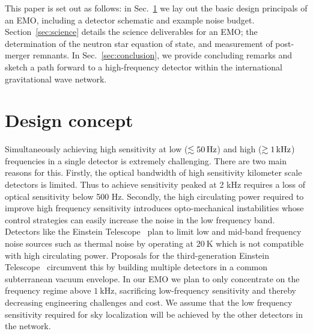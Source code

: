\documentclass[prx,superscriptaddress,twocolumn,nopreprintnumbers,floatfix,nofootinbib]{revtex4}
\begin{document}
This paper is set out as follows: in Sec.~\ref{sec:design} we lay out the basic design principals of an EMO, including a detector schematic and example noise budget.  Section~\ref{sec:science} details the science deliverables for an EMO; the determination of the neutron star equation of state, and measurement of post-merger remnants.  In Sec.~\ref{sec:conclusion}, we provide concluding remarks and sketch a path forward to a high-frequency detector within the international gravitational wave network.

\section{Design concept}\label{sec:design}

Simultaneously achieving high sensitivity at low ($\lesssim\unit[50]{Hz}$) and high ($\gtrsim\unit[1]{kHz}$) frequencies in a single detector is extremely challenging. There are two main reasons for this. Firstly, the optical bandwidth of high sensitivity kilometer scale detectors is limited. Thus to achieve sensitivity peaked at 2 kHz requires a loss of optical sensitivity below 500 Hz. Secondly, the high circulating power required to improve high frequency sensitivity introduces opto-mechanical instabilities whose control strategies can easily increase the noise in the low frequency band. Detectors like the Einstein Telescope~\cite{ET} plan to limit low and mid-band frequency noise sources such as thermal noise by operating at $20~\mathrm{K}$ which is not compatible with high circulating power.
Proposals for the third-generation Einstein Telescope~\cite{ET} circumvent this by building multiple detectors in a common subterranean vacuum envelope. In our EMO we plan to only concentrate on the frequency regime above $1~\mathrm{kHz}$, sacrificing low-frequency sensitivity and thereby decreasing engineering challenges and cost. We assume that the low frequency sensitivity required for sky localization will be achieved by the other detectors in the network.
\end{document}

